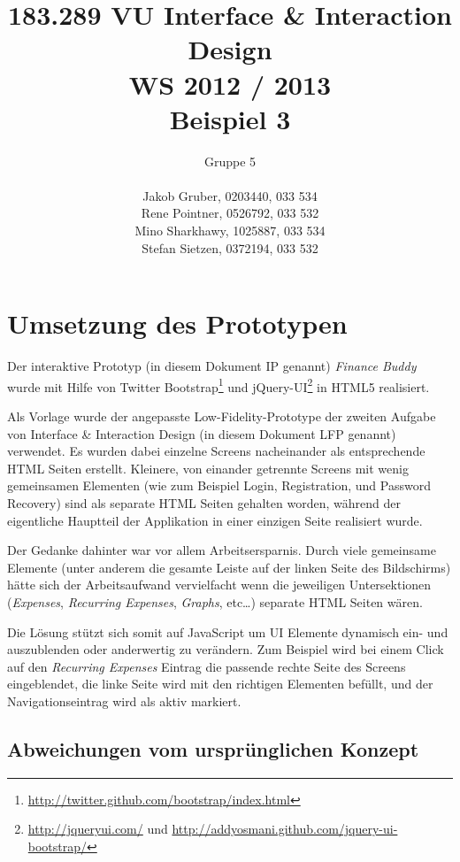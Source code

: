 \documentclass[a4paper,10pt]{article}
\title{
    183.289 VU Interface \& Interaction Design \\
    WS 2012 / 2013 \\
    Beispiel 3}
\author{
    Gruppe 5 \\ \\
    Jakob Gruber, 0203440, 033 534 \\
    Rene Pointner, 0526792, 033 532\\
    Mino Sharkhawy, 1025887, 033 534 \\
    Stefan Sietzen, 0372194, 033 532}
\begin{document}
\maketitle

\clearpage
\tableofcontents

\clearpage
\section{Umsetzung des Prototypen}

Der interaktive Prototyp (in diesem Dokument IP genannt) \emph{Finance Buddy} wurde mit Hilfe von Twitter
Bootstrap\footnote{\url{http://twitter.github.com/bootstrap/index.html}}
und jQuery-UI\footnote{\url{http://jqueryui.com/} und
\url{http://addyosmani.github.com/jquery-ui-bootstrap/}} in HTML5 realisiert.

Als Vorlage wurde der angepasste Low-Fidelity-Prototype der zweiten Aufgabe von Interface \&
Interaction Design (in diesem Dokument LFP genannt) verwendet. Es wurden dabei einzelne Screens nacheinander als
entsprechende HTML Seiten erstellt. Kleinere, von einander getrennte Screens mit
wenig gemeinsamen Elementen (wie zum Beispiel Login, Registration, und Password Recovery)
sind als separate HTML Seiten gehalten worden, w\"ahrend der eigentliche Hauptteil
der Applikation in einer einzigen Seite realisiert wurde.

Der Gedanke dahinter war vor allem Arbeitsersparnis. Durch viele gemeinsame Elemente (unter
anderem die gesamte Leiste auf der linken Seite des Bildschirms) h\"atte sich der
Arbeitsaufwand vervielfacht wenn die jeweiligen Untersektionen (\emph{Expenses},
\emph{Recurring Expenses}, \emph{Graphs}, etc\ldots) separate HTML Seiten w\"aren.

Die L\"osung st\"utzt sich somit auf JavaScript um UI Elemente dynamisch ein- und
auszublenden oder anderwertig zu ver\"andern. Zum Beispiel wird bei einem Click auf
den \emph{Recurring Expenses} Eintrag die passende rechte Seite des Screens eingeblendet,
die linke Seite wird mit den richtigen Elementen bef\"ullt, und der Navigationseintrag
wird als aktiv markiert.

\subsection{Abweichungen vom urspr\"unglichen Konzept}
\end{document}
